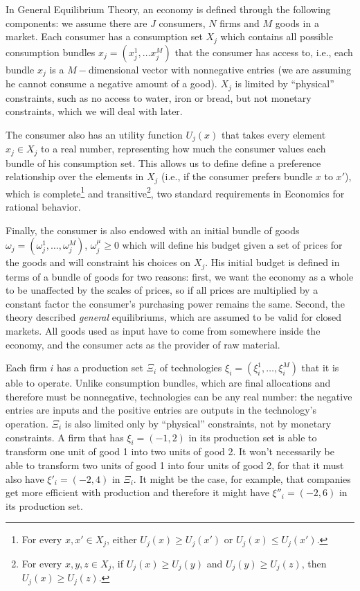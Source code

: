 In General Equilibrium Theory, an economy is defined through the following components: we assume there are $J$ consumers, $N$ firms and $M$
goods in a market. Each consumer has a consumption set $X_j$ which contains all possible consumption bundles $x_j = (x_j^1, \ldots x_j^M)$ that the
consumer has access to, i.e., each bundle $x_j$ is a $M-$dimensional vector with nonnegative entries (we are assuming he cannot consume a
negative amount of a good). $X_j$ is limited by ``physical'' constraints, such as no access to water, iron or bread, but not monetary
constraints, which we will deal with later.

The consumer also has an utility function $U_j(x)$ that takes every element $x_j \in X_j$ to a real number, representing how much the
consumer values each bundle of his consumption set. This allows us to define define a preference relationship over the elements in $X_j$
(i.e., if the consumer prefers bundle $x$ to $x'$), which is complete\footnote{For every $x, x' \in X_j$, either
  $U_j(x) \geq U_j(x')$ or $U_j(x) \leq U_j(x')$.} and transitive\footnote{For every $x, y, z \in X_j$, if
  $U_j(x) \geq U_j(y)$ and $U_j(y) \geq U_j(z)$, then $U_j(x) \geq U_j(z)$.}, two standard requirements in Economics for
rational behavior.

Finally, the consumer is also endowed with an initial bundle of goods $\omega_j = (\omega_j^1, \ldots, \omega_j^M)$, $\omega_j^\mu \geq 0$
which will define his budget given a set of prices for the goods and will constraint his choices on $X_j$. His initial budget is defined in terms of a bundle of goods for two reasons: first, we want the economy as a whole to be unaffected by the scales of prices, so if all prices are multiplied by a constant factor the consumer's purchasing power remains the same. Second, the theory described \textit{general} equilibriums, which are assumed to be valid for closed markets. All goods used as input have to come from somewhere inside the economy, and the consumer acts as the provider of raw material.

Each firm $i$ has a production set $\Xi_i$ of technologies $\xi_i = (\xi_i^1, \ldots, \xi_i^M)$ that it is able to operate. Unlike
consumption bundles, which are final allocations and therefore must be nonnegative, technologies can be any real number: the negative entries
are inputs and the positive entries are outputs in the technology's operation. $\Xi_i$ is also limited only by ``physical'' constraints, not
by monetary constraints. A firm that has $\xi_i = (-1, 2)$ in its production set is able to transform one unit of good 1 into two units
of good 2. It won't necessarily be able to transform two units of good 1 into four units of good 2, for that it must also have $\xi'_i = (-2,
4)$ in $\Xi_i$. It might be the case, for example, that companies get more efficient with production and therefore it might have $\xi''_i = (-2, 6)$ in its production set.

